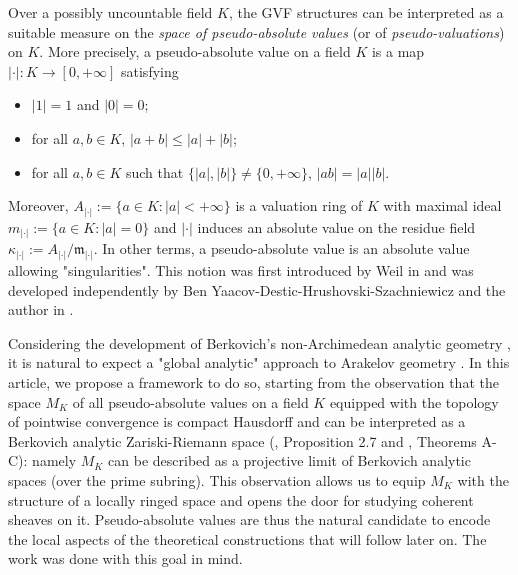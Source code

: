 \documentclass [11pt,reqno]{amsart}
\newcommand{\1}{\mathmybb{1}}
\def\m{\mathfrak m}
\begin{document}
Over a possibly uncountable field $K$, the GVF structures can be interpreted as a suitable measure on the  \emph{space of pseudo-absolute values} (or of \emph{pseudo-valuations}) on $K$. More precisely, a pseudo-absolute value on a field $K$ is a map $|\cdot| : K \to [0,+\infty]$ satisfying 
\begin{itemize}
\item[(i)] $|1| = 1$ and $|0|=0$;
	\item[(ii)] for all $a,b\in K$, $|a+b| \leq |a|+|b|$;
	\item[(iii)] for all $a,b\in K$ such that $\{|a|,|b|\}\neq \{0,+\infty\}$, $|ab| = |a||b|$. 
\end{itemize}
Moreover, $A_{|\cdot|}:=\{a\in K:|a|<+\infty\}$ is a valuation ring of $K$ with maximal ideal $m_{|\cdot|}:=\{a\in K:|a|=0\}$ and $|\cdot|$ induces an absolute value on the residue field $\kappa_{|\cdot|}:=A_{|\cdot|}/\m_{|\cdot|}$. In other terms, a pseudo-absolute value is an absolute value allowing "singularities". This notion was first introduced by Weil in \cite{Weil51} and was developed independently by Ben Yaacov-Destic-Hrushovski-Szachniewicz \cite{GVF24} and the author in \cite{Sedillot_pav}. 

Considering the development of Berkovich's non-Archimedean analytic geometry \cite{Berko90,ChambertLoir06,CLD12,GK17,GK19,LemanissierPoineau24}, it is natural to expect a "global analytic" approach to Arakelov geometry \cite{Paugam09,YuanZhang21,CaiGubler24,Song25}. In this article, we propose  a framework to do so, starting from the observation that the space $M_{K}$ of all pseudo-absolute values on a field $K$ equipped with the topology of pointwise convergence is compact Hausdorff and can be interpreted as a Berkovich analytic Zariski-Riemann space (\cite{GVF24}, Proposition 2.7 and \cite{Sedillot_pav}, Theorems A-C): namely $M_{K}$ can be described as a projective limit of Berkovich analytic spaces (over the prime subring). This observation allows us to equip $M_{K}$ with the structure of a locally ringed space and opens the door for studying coherent sheaves on it. Pseudo-absolute values are thus the natural candidate to encode the local aspects of the theoretical constructions that will follow later on. The work \cite{Sedillot_pav} was done with this goal in mind. 
\end{document}
